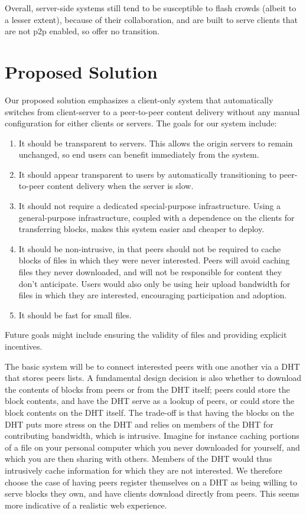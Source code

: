 Overall, server-side systems still tend to be susceptible to flash crowds (albeit to a lesser extent), because of their collaboration, and are built to serve clients that are not p2p enabled, so offer no transition.


\section {Proposed Solution}\label{section:solution}
Our proposed solution emphasizes a client-only system that automatically switches from client-server to a peer-to-peer content delivery without any manual configuration for either clients or servers.  The goals for our system include:
\begin{enumerate}
\item It should be transparent to servers.  This allows the origin servers to remain unchanged, so end users can benefit immediately from the system.
\item It should appear transparent to users by automatically transitioning to peer-to-peer content delivery when the server is slow.
\item It should not require a dedicated special-purpose infrastructure.  Using a general-purpose infrastructure, coupled with a dependence on the clients for transferring blocks, makes this system easier and cheaper to deploy.
\item It should be non-intrusive, in that peers should not be required to cache blocks of files in which they were never interested.  Peers will avoid caching files they never downloaded, and will not be responsible for content they don't anticipate.  Users would also only be using heir upload bandwidth for files in which they are interested, encouraging participation and adoption.
\item It should be fast for small files.
\end{enumerate} 

Future goals might include ensuring the validity of files and providing explicit incentives.

The basic system will be to connect interested peers with one another via a DHT that stores peers lists.  A fundamental design decision is also whether to download the contents of blocks from peers or from the DHT itself; peers could store the block contents, and have the DHT serve as a lookup of peers, or could store the block contents on the DHT itself.  The trade-off is that having the blocks on the DHT puts more stress on the DHT and relies on members of the DHT for contributing bandwidth, which is intrusive.  Imagine for instance caching portions of a file on your personal computer which you never downloaded for yourself, and which you are then sharing with others.  Members of the DHT would thus intrusively cache information for which they are not interested.  We therefore choose the case of having peers register themselves on a DHT as being willing to serve blocks they own, and have clients download directly from peers.  This seems more indicative of a realistic web experience.


